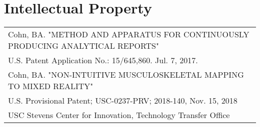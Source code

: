 \documentclass[10pt,a4paper]{article}
\begin{document}
\vspace*{3mm}\section*{Intellectual Property}

  \vspace*{1mm}
  \begin{tabularx}{17cm}{X}
Cohn, BA. "METHOD AND APPARATUS FOR CONTINUOUSLY PRODUCING ANALYTICAL REPORTS"\\
 U.S. Patent Application No.: 15/645,860. Jul. 7, 2017.\\[2mm]

Cohn, BA. "NON-INTUITIVE MUSCULOSKELETAL MAPPING TO MIXED REALITY"\\
 U.S. Provisional Patent; USC-0237-PRV; 2018-140, Nov. 15, 2018\\
 USC Stevens Center for Innovation, Technology Transfer Office\\[2mm]

  \end{tabularx}
\end{document}
